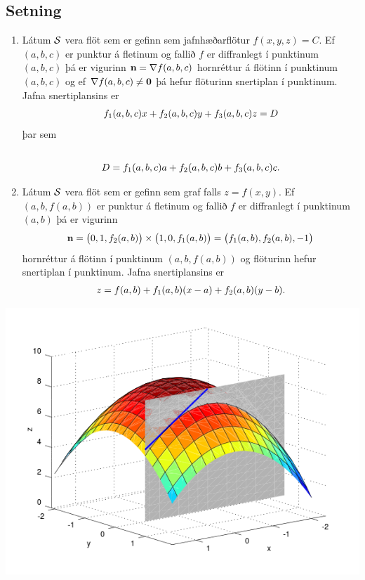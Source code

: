 \documentclass[a4paper,10pt,icelandic]{sphinxmanual}
\begin{document}
\subsection{Setning}
\label{Kafli5:id17}\begin{enumerate}
\item {} 
Látum \(\cal S\) vera flöt sem er gefinn sem jafnhæðarflötur
\(f(x,y,z)=C\). Ef \((a, b, c)\) er punktur á fletinum og
fallið \(f\) er diffranlegt í punktinum \((a, b,c)\) þá er
vigurinn \(\mbox{${\bf n}$}=\nabla f(a, b, c)\) hornréttur á
flötinn í punktinum \((a,b, c)\) og ef
\(\nabla f(a, b, c)\neq \mbox{${\bf 0}$}\) þá hefur flöturinn
snertiplan í punktinum. Jafna snertiplansins er
\begin{gather}
\begin{split}\displaystyle f_1(a, b, c)x+f_2(a, b, c)y+f_3(a, b, c)z=D\end{split}\notag
\end{gather}
þar sem
\begin{gather}
\begin{split}\displaystyle\end{split}\notag\\\begin{split}D= f_1(a, b, c)a+f_2(a, b, c)b
+f_3(a, b, c)c.\end{split}\notag
\end{gather}
\item {} 
Látum \(\cal S\) vera flöt sem er gefinn sem graf falls
\(z=f(x,y)\). Ef \((a, b, f(a,b))\) er punktur á fletinum og
fallið \(f\) er diffranlegt í punktinum \((a, b)\) þá er
vigurinn
\begin{gather}
\begin{split}\displaystyle \mbox{${\bf n}$}=\big(0 ,1 ,f_2(a, b)\big)\times\big(1 ,0 ,f_1(a, b)\big)=\big(f_1(a, b), f_2(a, b), -1\big)\end{split}\notag
\end{gather}
hornréttur á flötinn í punktinum \((a,b, f(a,b))\) og flöturinn
hefur snertiplan í punktinum. Jafna snertiplansins er
\begin{gather}
\begin{split}\displaystyle z=f(a, b)+f_1(a, b)(x-a)+f_2(a, b)(y-b).\end{split}\notag
\end{gather}
\end{enumerate}

{\hfill\includegraphics[width=0.700\linewidth]{xpart.png}\hfill}
\end{document}
